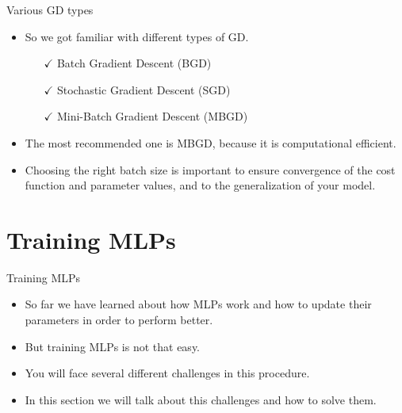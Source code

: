 \documentclass[compress,oilve,t]{beamer}
\begin{document}
\begin{frame}{Various GD types}
	\begin{itemize}
		\item So we got familiar with different types of GD.
		\begin{itemize}
			\item[\color{darkgreen}$\checkmark$] Batch Gradient Descent (BGD)
			\item[\color{darkgreen}$\checkmark$] Stochastic Gradient Descent (SGD)
			\item[\color{darkgreen}$\checkmark$] Mini-Batch Gradient Descent (MBGD)
		\end{itemize}
		\item[]
		\item[]
		\item The most recommended one is MBGD, because it is computational efficient.
		\item Choosing the right batch size is important to ensure convergence of the cost function and parameter values, and to the generalization of your model.
	\end{itemize}
\end{frame}

\section{Training MLPs}
\begin{frame}{Training MLPs}
	\begin{itemize}
		\item So far we have learned about how MLPs work and how to update their parameters in order to perform better.
		\item But training MLPs is not that easy.
		\item You will face several different challenges in this procedure.
		\item In this section we will talk about this challenges and how to solve them.
	\end{itemize}
\end{frame}
\end{document}
